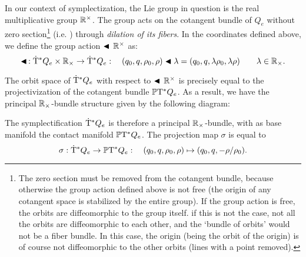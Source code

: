 In our context of symplectization, the Lie group in question is the real multiplicative group $\mathbb{R}^\times$. The group acts on the cotangent bundle of $Q_e$ without zero section\footnote
{
    The zero section must be removed from the cotangent bundle, because otherwise the group action defined above is not free (the origin of any cotangent space is stabilized by the entire group). If the group action is free, the orbits are diffeomorphic to the group itself. if this is not the case, not all the orbits are diffeomorphic to each other, and the `bundle of orbits' would not be a fiber bundle. In this case, the origin (being the orbit of the origin) is of course not diffeomorphic to the other orbits (lines with a point removed).
}
(i.e. ) through \emph{dilation of its fibers}. In the coordinates defined above, we define the group action $\blacktriangleleft\,\mathbb{R}^\times$ as:
$$ \blacktriangleleft\,: \mathrm{\dot{T}}^*Q_e\times\mathbb{R}_{\times} \to \mathrm{\dot{T}}^*Q_e : \quad (q_0, q, \rho_0, \rho) \blacktriangleleft \lambda = (q_0, q, \lambda \rho_0, \lambda \rho ) \qquad \lambda \in \mathbb{R}_{\times}.$$

The orbit space of $\mathrm{\dot{T}}^*Q_e$ with respect to $\blacktriangleleft\,\mathbb{R}^\times$ is precisely equal to the projectivization of the cotangent bundle $\mathbb{P}\mathrm{T}^* Q_e$. As a result, we have the principal $\mathbb{R}_{\times}$-bundle structure given by the following diagram:
\begin{center}
\end{center}

The symplectification $\mathrm{\dot{T}}^*Q_e$ is therefore a principal $\mathbb{R}_{\times}$-bundle, with as base manifold the contact manifold $\mathbb{P}\mathrm{T}^* Q_e$. The projection map $\sigma$ is equal to
$$ \sigma: \mathrm{\dot{T}}^*Q_e \to \mathbb{P}\mathrm{T}^* Q_e: \quad (q_0, q, \rho_0, \rho) \mapsto (q_0, q, -\rho/\rho_0).$$

